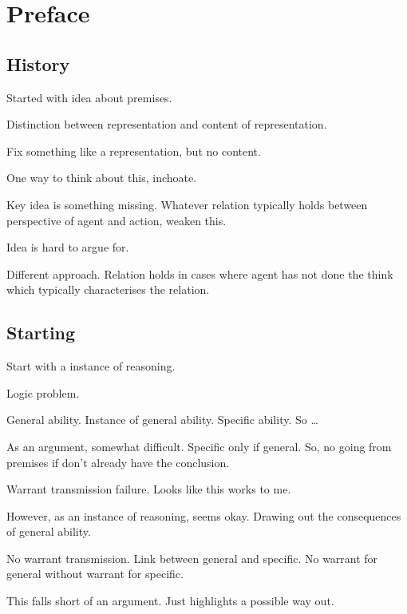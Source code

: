 \chapter{Preface}
\label{cha:introduction}

\section{History}

\begin{note}
  Started with idea about premises.

  Distinction between representation and content of representation.

  Fix something like a representation, but no content.

  One way to think about this, inchoate.
\end{note}

\begin{note}
  Key idea is something missing.
  Whatever relation typically holds between perspective of agent and action, weaken this.
\end{note}

\begin{note}
  Idea is hard to argue for.
\end{note}

\begin{note}
  Different approach.
  Relation holds in cases where agent has not done the think which typically characterises the relation.
\end{note}

\section{Starting}
\nocite{Brown:2004us}

\begin{note}
  Start with a instance of reasoning.

  Logic problem.

  General ability.
  Instance of general ability.
  Specific ability.
  So \dots

  As an argument, somewhat difficult.
  Specific only if general.
  So, no going from premises if don't already have the conclusion.

  Warrant transmission failure.
  Looks like this works to me.

  However, as an instance of reasoning, seems okay.
  Drawing out the consequences of general ability.

  No warrant transmission.
  Link between general and specific.
  No warrant for general without warrant for specific.

  This falls short of an argument.
  Just highlights a possible way out.
\end{note}

